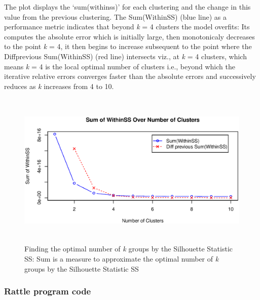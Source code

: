 \documentclass{DissertateUSU}
\begin{document}
The plot displays the `sum(withinss)' for each clustering and the change
in this value from the previous clustering. The Sum(WithinSS) (blue
line) as a performance metric indicates that beyond \emph{k} = 4
clusters the model overfits: Its computes the absolute error which is
initially large, then monotonicaly decreases to the point \emph{k} = 4,
it then begins to increase subsequent to the point where the
Diffprevious Sum(WithinSS) (red line) intersects viz., at \emph{k} = 4
clusters, which means \emph{k} = 4 is the local optimal number of
clusters i.e., beyond which the iterative relative errors converges
faster than the absolute errors and successively reduces as \emph{k}
increases from 4 to 10.

\begin{figure}
\centering
\includegraphics[width=15cm, height=7.5cm]{IterateKmeans.eps}
\caption{Finding the optimal number of \emph{k} groups by the Silhouette Statistic SS: Sum is a  measure to approximate the optimal number of \emph{k} groups by the Silhouette Statistic SS}
\label{IterateKmeans}
\end{figure}

\subsubsection{Rattle program code}
\end{document}
